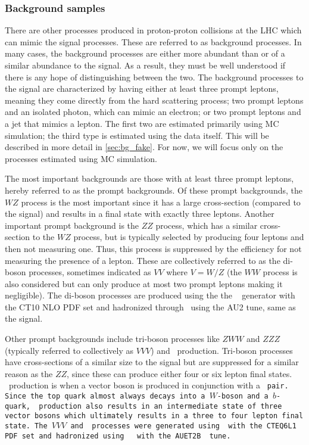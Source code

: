 \subsubsection{Background samples}
\label{sec:www_bg_samples}

There are other processes produced in proton-proton collisions at the LHC
which can mimic the signal processes. These are referred to as background processes.
In many cases, the background processes are either
more abundant than or of a similar abundance to
the signal. As a result, they must be well understood if there is any hope
of distinguishing between the two. The background processes to the signal
are characterized by having either at least three prompt leptons, meaning they
come directly from the hard scattering process;  
two prompt leptons and an isolated photon, which can mimic an electron;
or two prompt leptons and a jet that mimics a lepton.
The first two are estimated primarily using MC simulation; the third type
is estimated using the data itself. 
This will be described in more detail in \sec\ref{sec:bg_fake}.
For now, we will focus only on the processes estimated using MC simulation.

The most important backgrounds are those with at least three prompt leptons, 
hereby referred to as the prompt backgrounds. Of these prompt backgrounds,
the $WZ$ process is the most important since it has a 
large cross-section (compared to the signal)
and results in a final state with exactly three leptons. Another important 
prompt background is the $ZZ$ process,
which has a similar cross-section to the $WZ$ process, but is typically 
selected by producing
four leptons and then not measuring one. Thus, this process is suppressed by the 
efficiency for not measuring the presence of a lepton. 
These are collectively referred to as the di-boson processes, sometimes
indicated as $VV$ where $V=W/Z$ (the $WW$ process is also considered
but can only produce at most two prompt leptons making it negligible). 
The di-boson processes are produced using the 
the \powheg~\cite{Alioli:2008gx,Nason:2004rx,Frixione:2007vw,Alioli:2010xd} generator
with the CT10 NLO PDF set and 
hadronized through \pythiaeight~using the AU2 tune, same as the signal.

Other prompt backgrounds 
include tri-boson processes like $ZWW$ and $ZZZ$ 
(typically referred to collectively as $VVV$)
and \ttV~production. Tri-boson processes
have cross-sections of a similar size to the signal but are suppressed 
for a similar reason
as the $ZZ$, since these can produce either four or six lepton final 
states. 
\ttV~production is when a vector
boson is produced in conjunction with a \tt~pair. 
Since the top quark almost always decays
into a $W$-boson and a $b$-quark, \ttV~production also results in an intermediate
state of three vector bosons which ultimately results in a three to four lepton
final state.
The $VVV$ and \ttV~processes were generated using \madgraph~with the 
CTEQ6L1 PDF set and hadronized
using \pythiasix~\cite{PYTHIA} with the AUET2B~\cite{ATL-PHYS-PUB-2011-009} 
tune.

